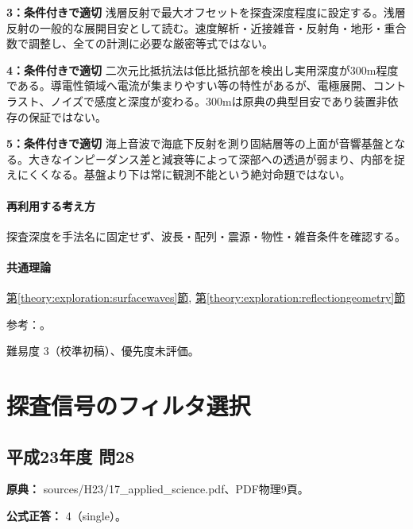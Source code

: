 \noindent\textbf{3：条件付きで適切} 浅層反射で最大オフセットを探査深度程度に設定する。浅層反射の一般的な展開目安として読む。速度解析・近接雑音・反射角・地形・重合数で調整し、全ての計測に必要な厳密等式ではない。\par

\noindent\textbf{4：条件付きで適切} 二次元比抵抗法は低比抵抗部を検出し実用深度が300m程度である。導電性領域へ電流が集まりやすい等の特性があるが、電極展開、コントラスト、ノイズで感度と深度が変わる。300mは原典の典型目安であり装置非依存の保証ではない。\par

\noindent\textbf{5：条件付きで適切} 海上音波で海底下反射を測り固結層等の上面が音響基盤となる。大きなインピーダンス差と減衰等によって深部への透過が弱まり、内部を捉えにくくなる。基盤より下は常に観測不能という絶対命題ではない。\par

\paragraph{再利用する考え方} 探査深度を手法名に固定せず、波長・配列・震源・物性・雑音条件を確認する。

\paragraph{共通理論} \hyperref[theory:exploration:surfacewaves]{第\ref*{theory:exploration:surfacewaves}節}, \hyperref[theory:exploration:reflectiongeometry]{第\ref*{theory:exploration:reflectiongeometry}節}

\par 参考：\cite{moe_surface2004,epa_surfacewaves,segj_integrated2017,epa_seismic_reflection}。

\par 難易度 3（校準初稿）、優先度未評価。

\section{探査信号のフィルタ選択}

\subsection{平成23年度 問28}
\label{q:h23-reg-applied-28}

\noindent\textbf{原典：} sources/H23/17\_applied\_science.pdf、PDF物理9頁。

\textbf{公式正答：} 4（single）。

